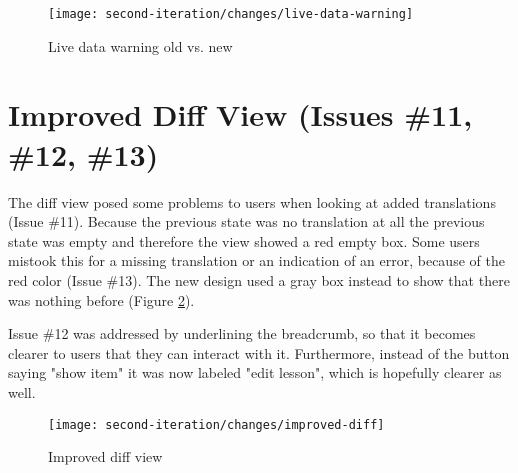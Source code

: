 


\begin{figure}[h!]
 \centering
 \texttt{[image: second-iteration/changes/live-data-warning]}
 \caption{Live data warning old vs. new}
 \label{fig:live-data-warning}
\end{figure}


\section{Improved Diff View (Issues \#11, \#12, \#13)}
The diff view posed some problems to users when looking at added translations (Issue \#11). Because the previous state was no translation at all the previous state was empty and therefore the view showed a red empty box. Some users mistook this for a missing translation or an indication of an error, because of the red color (Issue \#13). The new design used a gray box instead to show that there was nothing before (Figure \ref{fig:improved-diff-view}). 

Issue \#12 was addressed by underlining the breadcrumb, so that it becomes clearer to users that they can interact with it. Furthermore, instead of the button saying "show item" it was now labeled "edit lesson", which is hopefully clearer as well.

\begin{figure}[h!]
 \centering
 \texttt{[image: second-iteration/changes/improved-diff]}
 \caption{Improved diff view}
 \label{fig:improved-diff-view}
\end{figure}

